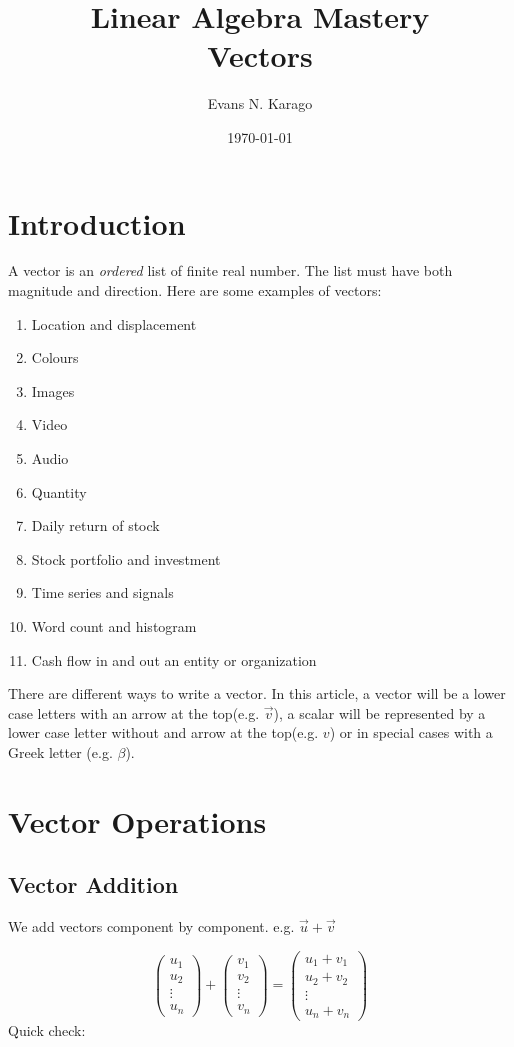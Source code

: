 \documentclass[11pt]{article}
\title{Linear Algebra Mastery \\ 
\large Vectors
}
\author{Evans N. Karago}
\date{\today}
\begin{document}
\maketitle

\section{Introduction}
A vector is an \textit{ordered} list of finite real number. The list must have both magnitude and direction. Here are some examples of vectors:
\begin{enumerate}
\item Location and displacement
\item Colours 
\item Images
\item Video
\item Audio
\item Quantity
\item Daily return of stock
\item Stock portfolio and investment
\item Time series and signals
\item Word count and histogram
\item Cash flow in and out an entity or organization
\end{enumerate}
There are different ways to write a vector. In this article,  a vector will be a lower case letters with an arrow at the top(e.g. $\vec v$),  a  scalar will be represented by a lower case letter without and arrow at the top(e.g. $v$) or in special cases with a Greek letter (e.g. $\beta$). 
\section{Vector Operations}

\subsection{Vector Addition}
We add vectors component by component. e.g.  $\vec u + \vec v$

\[
\begin{pmatrix}
u_1\\
u_2\\
\vdots \\
u_n
\end{pmatrix}
+
\begin{pmatrix}
v_1\\
v_2\\
\vdots\\
v_n
\end{pmatrix}
=
\begin{pmatrix}
u_1 + v_1\\
u_2 + v_2\\
\vdots\\
u_n + v_n
\end{pmatrix}
\]
Quick check:
\end{document}

